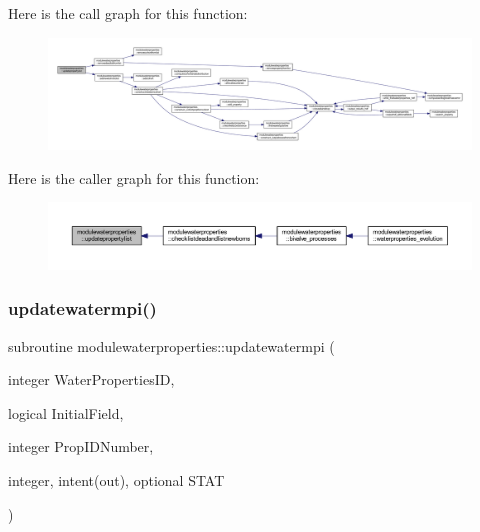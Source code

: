 Here is the call graph for this function\+:\nopagebreak
\begin{figure}[H]
\begin{center}
\leavevmode
\includegraphics[width=350pt]{namespacemodulewaterproperties_a8ab7e6ee60b7c71bc6775c1586bd99b3_cgraph}
\end{center}
\end{figure}
Here is the caller graph for this function\+:\nopagebreak
\begin{figure}[H]
\begin{center}
\leavevmode
\includegraphics[width=350pt]{namespacemodulewaterproperties_a8ab7e6ee60b7c71bc6775c1586bd99b3_icgraph}
\end{center}
\end{figure}
\mbox{\label{namespacemodulewaterproperties_a12cedfb20b7e67e1de82bb36c9375e95}} 
\subsubsection{\texorpdfstring{updatewatermpi()}{updatewatermpi()}}
{\footnotesize\ttfamily subroutine modulewaterproperties\+::updatewatermpi (\begin{DoxyParamCaption}\item[{integer}]{Water\+Properties\+ID,  }\item[{logical}]{Initial\+Field,  }\item[{integer}]{Prop\+I\+D\+Number,  }\item[{integer, intent(out), optional}]{S\+T\+AT }\end{DoxyParamCaption})\hspace{0.3cm}{\ttfamily [private]}}

